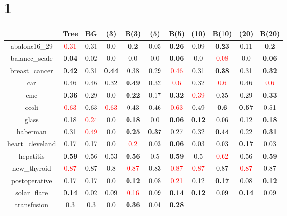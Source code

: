 \documentclass{article}%
\begin{document}
\section*{1}%
\begin{tabular}{c|cccccccccc}%
\hline%
&Tree&BG&(3)&B(3)&(5)&B(5)&(10)&B(10)&(20)&B(20)\\%
\hline%
abalone16\_29&\textcolor{red}{ 
0.31
}&0.31&0.0&\textbf{0.2}&0.05&\textbf{0.26}&0.09&\textbf{0.23}&0.11&\textbf{0.2}\\%
\hline%
balance\_scale&\textbf{0.04}&0.02&0.0&0.0&0.0&\textbf{0.06}&0.0&\textcolor{red}{ 
0.08
}&0.0&\textbf{0.06}\\%
\hline%
breast\_cancer&\textbf{0.42}&0.31&\textbf{0.44}&0.38&0.29&\textcolor{red}{ 
0.46
}&0.31&\textbf{0.38}&0.31&\textbf{0.32}\\%
\hline%
car&0.46&0.46&0.32&\textbf{0.49}&0.32&\textcolor{red}{ 
0.6
}&0.32&\textcolor{red}{ 
0.6
}&0.46&\textcolor{red}{ 
0.6
}\\%
\hline%
cmc&\textbf{0.36}&0.29&0.0&\textbf{0.22}&0.17&\textbf{0.32}&\textcolor{red}{ 
0.39
}&0.35&0.29&\textbf{0.33}\\%
\hline%
ecoli&\textcolor{red}{ 
0.63
}&0.63&\textcolor{red}{ 
0.63
}&0.43&0.46&\textcolor{red}{ 
0.63
}&0.49&\textbf{0.6}&\textbf{0.57}&0.51\\%
\hline%
glass&0.18&\textcolor{red}{ 
0.24
}&0.0&\textbf{0.18}&0.0&\textbf{0.06}&\textbf{0.12}&0.06&0.12&\textbf{0.18}\\%
\hline%
haberman&0.31&\textcolor{red}{ 
0.49
}&0.0&\textbf{0.25}&\textbf{0.37}&0.27&0.32&\textbf{0.44}&0.22&\textbf{0.31}\\%
\hline%
heart\_cleveland&0.17&0.17&0.0&\textcolor{red}{ 
0.2
}&0.03&\textbf{0.06}&0.03&0.03&\textbf{0.17}&0.03\\%
\hline%
hepatitis&\textbf{0.59}&0.56&0.53&\textbf{0.56}&0.5&\textbf{0.59}&0.5&\textcolor{red}{ 
0.62
}&0.56&\textbf{0.59}\\%
\hline%
new\_thyroid&\textcolor{red}{ 
0.87
}&0.87&0.8&\textcolor{red}{ 
0.87
}&0.83&\textcolor{red}{ 
0.87
}&\textcolor{red}{ 
0.87
}&0.87&\textcolor{red}{ 
0.87
}&0.87\\%
\hline%
postoperative&0.17&0.17&0.0&\textbf{0.12}&0.08&\textcolor{red}{ 
0.21
}&0.12&\textbf{0.17}&0.08&\textbf{0.12}\\%
\hline%
solar\_flare&\textbf{0.14}&0.02&0.09&\textcolor{red}{ 
0.16
}&0.09&\textbf{0.14}&\textbf{0.12}&0.09&\textbf{0.14}&0.09\\%
\hline%
transfusion&0.3&0.3&0.0&\textbf{0.36}&0.04&\textbf{0.28}&\textcolor{red}{ 
}
\end{tabular}
\end{document}

